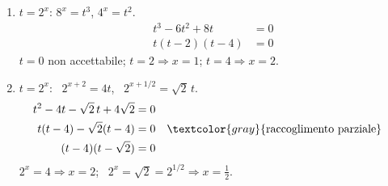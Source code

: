 \begin{question}[ID=3.6, subtitle={Equazioni esponenziali con incognita ausiliaria}, difficulty=difficile, tags={equazioni, esponenziali, sostituzione}]
\begin{explanation}
\begin{enumerate}
\[\begin{aligned}
    t+\dfrac1t &= \dfrac{97}{36}\\
    36t^2-97t+36 &= 0\\
    t &= \dfrac{97\pm\sqrt{9409-5184}}{72}=\dfrac{97\pm65}{72} \;\Rightarrow\; t=\dfrac94,\ t=\dfrac49
    \end{aligned}\]
    $\left(\tfrac23\right)^x=\tfrac49=\left(\tfrac23\right)^2 \Rightarrow x=2$; \ $\left(\tfrac23\right)^x=\tfrac94=\left(\tfrac23\right)^{-2} \Rightarrow x=-2$.
    \item $t=2^x$: $8^x=t^3$, $4^x=t^2$.
    \[\begin{aligned}
    t^3-6t^2+8t &= 0\\
    t(t-2)(t-4) &= 0
    \end{aligned}\]
    $t=0$ non accettabile; $t=2 \Rightarrow x=1$; $t=4 \Rightarrow x=2$.
    \item $t=2^x$: \ $2^{x+2}=4t$, \ $2^{x+1/2}=\sqrt2\,t$.
    \[\begin{aligned}
    t^2-4t-\sqrt2\,t+4\sqrt2 &= 0\\
    t(t-4)-\sqrt2(t-4) &= 0 && \textcolor{gray}{\text{raccoglimento parziale}}\\
    (t-4)(t-\sqrt2) &= 0
    \end{aligned}\]
    $2^x=4 \Rightarrow x=2$; \ $2^x=\sqrt2=2^{1/2} \Rightarrow x=\tfrac12$.
\end{enumerate}
\end{explanation}
\end{question}


